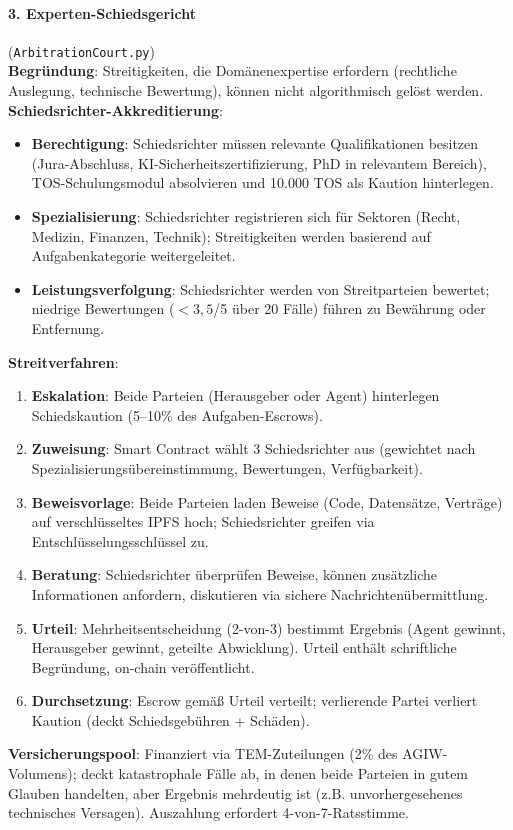 \documentclass[11pt]{article}
\begin{document}
\paragraph{3. Experten-Schiedsgericht} (\texttt{ArbitrationCourt.py})\\
\textbf{Begründung}: Streitigkeiten, die Domänenexpertise erfordern (rechtliche Auslegung, technische Bewertung), können nicht algorithmisch gelöst werden.\\
\textbf{Schiedsrichter-Akkreditierung}:
\begin{itemize}[noitemsep]
  \item \textbf{Berechtigung}: Schiedsrichter müssen relevante Qualifikationen besitzen (Jura-Abschluss, KI-Sicherheitszertifizierung, PhD in relevantem Bereich), TOS-Schulungsmodul absolvieren und 10.000 TOS als Kaution hinterlegen.
  \item \textbf{Spezialisierung}: Schiedsrichter registrieren sich für Sektoren (Recht, Medizin, Finanzen, Technik); Streitigkeiten werden basierend auf Aufgabenkategorie weitergeleitet.
  \item \textbf{Leistungsverfolgung}: Schiedsrichter werden von Streitparteien bewertet; niedrige Bewertungen ($<3,5$/5 über 20 Fälle) führen zu Bewährung oder Entfernung.
\end{itemize}
\textbf{Streitverfahren}:
\begin{enumerate}[noitemsep]
  \item \textbf{Eskalation}: Beide Parteien (Herausgeber oder Agent) hinterlegen Schiedskaution (5--10\% des Aufgaben-Escrows).
  \item \textbf{Zuweisung}: Smart Contract wählt 3 Schiedsrichter aus (gewichtet nach Spezialisierungsübereinstimmung, Bewertungen, Verfügbarkeit).
  \item \textbf{Beweisvorlage}: Beide Parteien laden Beweise (Code, Datensätze, Verträge) auf verschlüsseltes IPFS hoch; Schiedsrichter greifen via Entschlüsselungsschlüssel zu.
  \item \textbf{Beratung}: Schiedsrichter überprüfen Beweise, können zusätzliche Informationen anfordern, diskutieren via sichere Nachrichtenübermittlung.
  \item \textbf{Urteil}: Mehrheitsentscheidung (2-von-3) bestimmt Ergebnis (Agent gewinnt, Herausgeber gewinnt, geteilte Abwicklung). Urteil enthält schriftliche Begründung, on-chain veröffentlicht.
  \item \textbf{Durchsetzung}: Escrow gemäß Urteil verteilt; verlierende Partei verliert Kaution (deckt Schiedsgebühren + Schäden).
\end{enumerate}
\textbf{Versicherungspool}: Finanziert via TEM-Zuteilungen (2\% des AGIW-Volumens); deckt katastrophale Fälle ab, in denen beide Parteien in gutem Glauben handelten, aber Ergebnis mehrdeutig ist (z.B. unvorhergesehenes technisches Versagen). Auszahlung erfordert 4-von-7-Ratsstimme.
\end{document}
